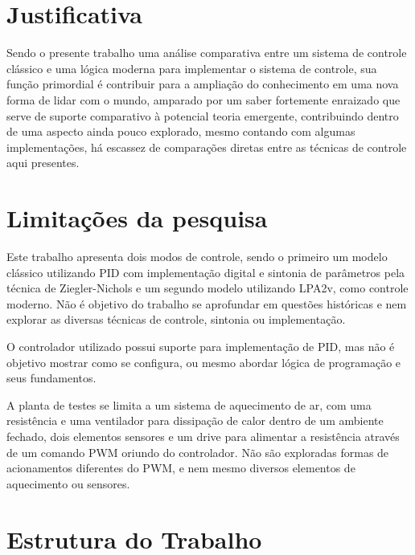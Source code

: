 \section{Justificativa}
Sendo o presente trabalho uma análise comparativa entre um sistema de controle clássico e uma lógica moderna para implementar o sistema de controle, sua função primordial é contribuir para a ampliação do conhecimento em uma nova forma de lidar com o mundo, amparado por um saber fortemente enraizado que serve de suporte comparativo à potencial teoria emergente, contribuindo dentro de uma aspecto ainda pouco explorado, mesmo contando com algumas implementações, há escassez de comparações diretas entre as técnicas de controle aqui presentes.

\section{Limitações da pesquisa}

Este trabalho apresenta dois modos de controle, sendo o primeiro um modelo clássico utilizando PID com implementação digital e sintonia de parâmetros pela técnica de Ziegler-Nichols e um segundo modelo utilizando LPA2v, como controle moderno. Não é objetivo do trabalho se aprofundar em questões históricas e nem explorar as diversas técnicas de controle, sintonia ou implementação.

O controlador utilizado possui suporte para implementação de PID, mas não é objetivo mostrar como se configura, ou mesmo abordar lógica de programação e seus fundamentos.

A planta de testes se limita a um sistema de aquecimento de ar, com uma resistência e uma ventilador para dissipação de calor dentro de um ambiente fechado, dois elementos sensores e um drive para alimentar a resistência através de um comando PWM oriundo do controlador. Não são exploradas formas de acionamentos diferentes do PWM, e nem mesmo diversos elementos de aquecimento ou sensores.





\section{Estrutura do Trabalho}
